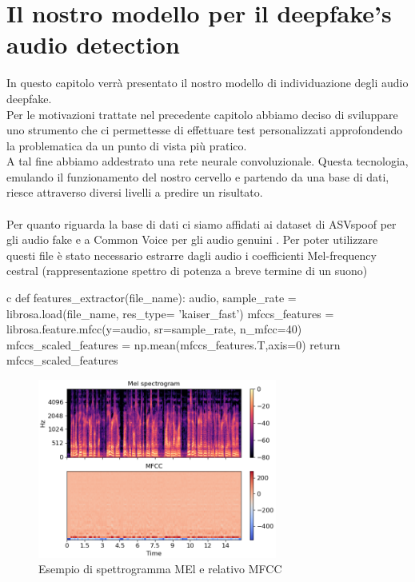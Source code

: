 \documentclass[12pt, a4paper]{article}
\begin{document}
\section{Il nostro modello per il deepfake's audio detection}
In questo capitolo verrà presentato il nostro modello di individuazione degli audio deepfake. \\
Per le motivazioni trattate nel precedente capitolo abbiamo deciso di sviluppare uno strumento che ci permettesse di effettuare test personalizzati approfondendo la problematica da un punto di vista più pratico.\\
A tal fine abbiamo addestrato una rete neurale convoluzionale. Questa tecnologia, emulando il funzionamento del nostro cervello e partendo da una base di dati, riesce attraverso diversi livelli a predire un risultato. \\\\
Per quanto riguarda la base di dati ci siamo affidati ai dataset di ASVspoof per gli audio fake \cite{FakeAudioDataset} e a Common Voice per gli audio genuini \cite{RealAudioDataset}.
Per poter utilizzare questi file è stato necessario estrarre dagli audio i coefficienti Mel-frequency cestral (rappresentazione spettro di potenza a breve termine di un suono)\\
\begin{code}
\label{code:python-code}
\begin{pythoncode}{c}
def features_extractor(file_name):
    audio, sample_rate = librosa.load(file_name, res_type= 'kaiser_fast') 
    mfccs_features = librosa.feature.mfcc(y=audio, sr=sample_rate, n_mfcc=40)
    mfccs_scaled_features = np.mean(mfccs_features.T,axis=0) 
    return mfccs_scaled_features  
\end{pythoncode}
\end{code}
\begin{figure}[h]
    \centering
    \includegraphics[width=0.7\textwidth]{img/librosa-feature-mfcc-1_00.png}
    \caption{Esempio di spettrogramma MEl e relativo MFCC }
\end{figure} 
\end{document}
